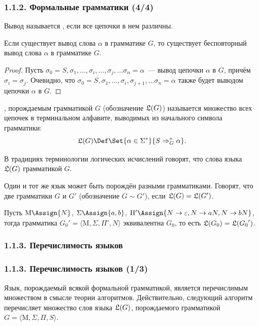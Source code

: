 \begin{frame}
\frametitle{1.1.2. Формальные грамматики (4/4)}
Вывод называется , если
все цепочки в нем различны.

\begin{lemma}
Если существует вывод слова $\alpha$ в грамматике $G$, то существует бесповторный
вывод слова $\alpha$ в грамматике $G$.
\end{lemma}
\begin{proof}
Пусть
$\sigma_0=S,\sigma_1,\dots,\sigma_i,\dots,\sigma_j,\dots\sigma_n=\alpha$~---
вывод цепочки $\alpha$ в $G$, причём $\sigma_i = \sigma_j$. Очевидно, что
$\sigma_0=S,\sigma_1,\dots,\sigma_i,\sigma_{j+1},\dots\sigma_n=\alpha$
также будет выводом цепочки $\alpha$ в $G$.
\end{proof}

\smallskip
{}, порождаемым
грамматикой $G$ (обозначение $\frak{L}(G)$) называется множество всех
цепочек в терминальном алфавите, выводимых из начального символа грамматики:
$$
\frak{L}(G)\Def \Set{\alpha\in \Sigma^*}{S\Rightarrow_G^*\alpha}.
$$
\begin{remark}
В традициях терминологии логических исчислений говорят, что слова языка $\frak{L}(G)$  грамматикой $G$.
\end{remark}

Один и тот же язык может быть порождён
разными грамматиками.
Говорят, что две грамматики $G$ и $G'$
 (обозначение
$G\sim G'$), если $\frak{L}(G)=\frak{L}(G')$.

\begin{example}
Пусть $\mathrm{M}\Assign \{N\}$,
$\Sigma\Assign\{a,b\}$,
${\Pi}'\Assign\{N\to \varepsilon, N\to aN,
N\to bN\}$, тогда грамматика  
${G_0}'=\langle \mathrm{M}, \Sigma, {\Pi}', N\rangle$ эквивалентна $G_0$,
то есть $\frak{L}(G_0)= \frak{L}({G_0}')$.
\end{example}
\end{frame}

\subsubsection{1.1.3. Перечислимость языков}
\label{1.1.3.}
\begin{frame}
\frametitle{1.1.3. Перечислимость языков (1/3)}
Язык, порождаемый всякой формальной грамматикой, 
является перечислимым множеством в смысле теории алгоритмов.
Действительно, следующий алгоритм перечисляет
множество слов языка $\frak{L}(G)$, порождаемого
грамматикой $G=\langle \mathrm{M}, \Sigma, \Pi, S\rangle$.

\medskip
{} 
\end{frame}

